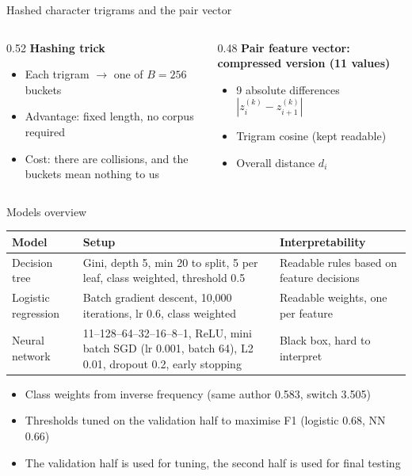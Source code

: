 \documentclass[aspectratio=169,11pt]{beamer}
\begin{document}
\begin{frame}{Hashed character trigrams and the pair vector}
\begin{columns}[T]
\begin{column}{0.52\textwidth}
\textbf{Hashing trick}
\begin{itemize}\itemsep0.3em
\item Each trigram $\rightarrow$ one of $B=256$ buckets
\item Advantage: fixed length, no corpus required
\item Cost: there are collisions, and the buckets mean nothing to us
\end{itemize}
\end{column}
\begin{column}{0.48\textwidth}
\textbf{Pair feature vector: compressed version (11 values)}
\begin{itemize}\itemsep0.3em
\item 9 absolute differences $|z_i^{(k)}-z_{i+1}^{(k)}|$
\item Trigram cosine (kept readable)
\item Overall distance $d_i$
\end{itemize}
\end{column}
\end{columns}
\end{frame}

\begin{frame}{Models overview}
\small
\begin{tabular}{p{2.7cm}p{6.5cm}p{3.5cm}}
\toprule
\textbf{Model} & \textbf{Setup} & \textbf{Interpretability}\\
\midrule
Decision tree & Gini, depth 5, min 20 to split, 5 per leaf, class weighted, threshold 0.5 & Readable rules based on feature decisions\\[0.4em]
Logistic regression & Batch gradient descent, 10,000 iterations, lr 0.6, class weighted & Readable weights, one per feature\\[0.4em]
Neural network & 11--128--64--32--16--8--1, ReLU, mini batch SGD (lr 0.001, batch 64), L2 0.01, dropout 0.2, early stopping & Black box, hard to interpret\\
\bottomrule
\end{tabular}
\medskip

\begin{itemize}\itemsep0.3em
\item Class weights from inverse frequency (same author 0.583, switch 3.505)
\item Thresholds tuned on the validation half to maximise F1 (logistic 0.68, NN 0.66)
\item The validation half is used for tuning, the second half is used for final testing
\end{itemize}
\end{frame}
\end{document}
